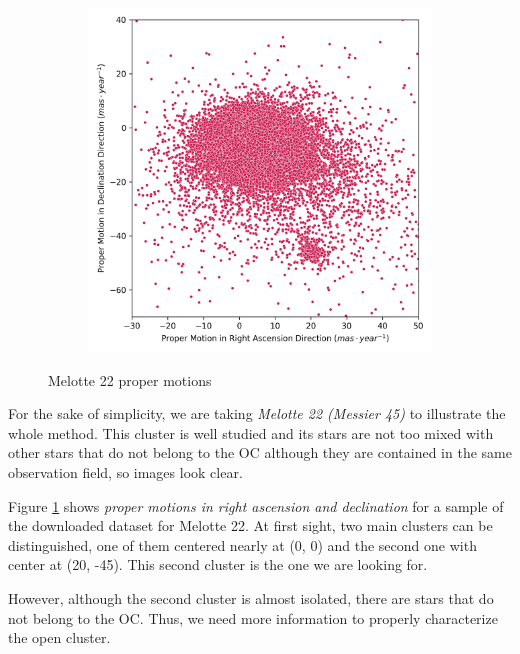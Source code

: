 \documentclass[11pt, a4paper, english]{book}
\begin{document}
\begin{figure}[htbp]
  \centering
  \begin{subfigure}{0.5\textwidth}
    \centering
    \includegraphics[width=\textwidth]{../figures/melotte_22/raw_pm_melotte_22.png}
  \end{subfigure}
  \caption{Melotte 22 proper motions}
  \label{fig:raw_pm_melotte_22}
\end{figure}

For the sake of simplicity, we are taking \emph{Melotte 22 (Messier 45)} \cite{elsanhoury2019ppmxl} to illustrate the whole method.
This cluster is well studied and its stars are not too mixed with other stars that do not belong to the OC
although they are contained in the same observation field, so images look clear.

Figure \ref{fig:raw_pm_melotte_22} shows \emph{proper motions in right ascension and declination}
for a sample of the downloaded dataset for Melotte 22.
At first sight, two main clusters can be distinguished, one of them centered nearly at (0, 0)
and the second one with center at (20, -45). This second cluster is the one we are looking for.

However, although the second cluster is almost isolated, there are stars that do not belong to the OC.
Thus, we need more information to properly characterize the open cluster.
\end{document}

